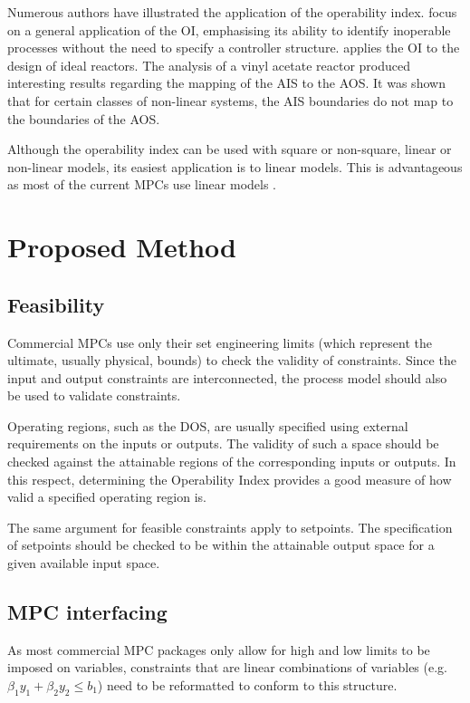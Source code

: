 \documentclass[final,authoryear,5pt,times,twocolumn]{elsarticle}
\begin{document}
Numerous authors have illustrated the application of the operability index. 
\citet{opconproc} focus on a general application of the OI, emphasising its ability to identify inoperable processes without the need to specify a controller structure. 
\citet{opidealrx} applies the OI to the design of ideal reactors. 
The analysis of a vinyl acetate reactor produced interesting results
regarding the mapping of the AIS to the AOS. 
It was shown that for certain classes of non-linear systems, the AIS boundaries do not map to the boundaries of the AOS.

Although the operability index can be used with square or non-square, linear or non-linear models, its easiest application is to linear models. 
This is advantageous as most of the current MPCs use linear models \citep{vinsonphd}.


\section{Proposed Method}\label{sec:method}

\subsection{Feasibility}\label{sec:feasibility}
Commercial MPCs use only their set engineering limits (which represent the ultimate, usually physical, bounds) to check the validity of constraints.
Since the input and output constraints are interconnected, the process model should also be used to validate constraints.

Operating regions, such as the DOS, are usually specified using external requirements on the inputs or outputs.
The validity of such a space should be checked against the attainable regions of the corresponding inputs or outputs.
In this respect, determining the Operability Index provides a good measure of how valid a specified operating region is.

The same argument for feasible constraints apply to setpoints.
The specification of setpoints should be checked to be within the attainable output space for a given available input space.

\subsection{MPC interfacing}\label{sec:lincons}
As most commercial MPC packages only allow for high and low limits to be imposed on variables, constraints that are linear combinations of variables (e.g. $\beta_1 y_1+\beta_2 y_2\leq b_1$) need to be reformatted to conform to this structure.
\end{document}

